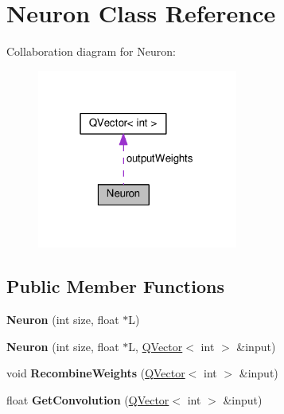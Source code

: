 \hypertarget{class_neuron}{}\section{Neuron Class Reference}
\label{class_neuron}


Collaboration diagram for Neuron\+:\nopagebreak
\begin{figure}[H]
\begin{center}
\leavevmode
\includegraphics[width=187pt]{class_neuron__coll__graph}
\end{center}
\end{figure}
\subsection*{Public Member Functions}
\begin{DoxyCompactItemize}
\item 
{\bfseries Neuron} (int size, float $\ast$L)\hypertarget{class_neuron_a4da0f6ba396e848a67759d08b4aebb84}{}\label{class_neuron_a4da0f6ba396e848a67759d08b4aebb84}

\item 
{\bfseries Neuron} (int size, float $\ast$L, \hyperlink{class_q_vector}{Q\+Vector}$<$ int $>$ \&input)\hypertarget{class_neuron_a7306deecddc6f9d94c598d3a48f86c55}{}\label{class_neuron_a7306deecddc6f9d94c598d3a48f86c55}

\item 
void {\bfseries Recombine\+Weights} (\hyperlink{class_q_vector}{Q\+Vector}$<$ int $>$ \&input)\hypertarget{class_neuron_a8fe0fb53c7a23bed3a843cd37037630b}{}\label{class_neuron_a8fe0fb53c7a23bed3a843cd37037630b}

\item 
float {\bfseries Get\+Convolution} (\hyperlink{class_q_vector}{Q\+Vector}$<$ int $>$ \&input)\hypertarget{class_neuron_a92a2a9bf900c645e29343f41962f158f}{}\label{class_neuron_a92a2a9bf900c645e29343f41962f158f}

\end{DoxyCompactItemize}
